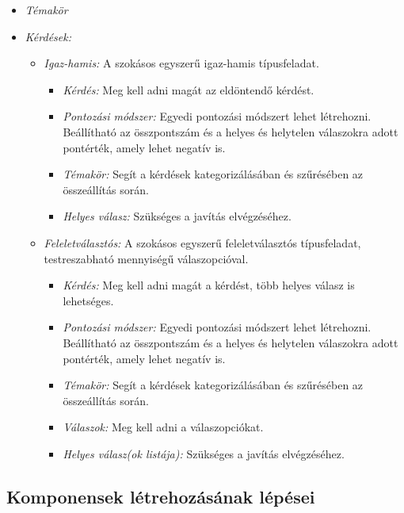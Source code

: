 \begin{itemize}
	\item \emph{Témakör}
	\item \emph{Kérdések:}
        \begin{itemize}
            \item \emph{Igaz-hamis:} A szokásos egyszerű igaz-hamis típusfeladat.
                \begin{itemize}
                    \item \emph{Kérdés:} Meg kell adni magát az eldöntendő kérdést.
                    \item \emph{Pontozási módszer:} Egyedi pontozási módszert lehet létrehozni. Beállítható az összpontszám és a helyes és helytelen válaszokra adott pontérték, amely lehet negatív is.
                    \item \emph{Témakör:} Segít a kérdések kategorizálásában és szűrésében az összeállítás során.
                    \item \emph{Helyes válasz:} Szükséges a javítás elvégzéséhez.
                \end{itemize}
            \item \emph{Feleletválasztós:} A szokásos egyszerű feleletválasztós típusfeladat, testreszabható mennyiségű válaszopcióval.
                \begin{itemize}
                    \item \emph{Kérdés:} Meg kell adni magát a kérdést, több helyes válasz is lehetséges.
                    \item \emph{Pontozási módszer:} Egyedi pontozási módszert lehet létrehozni. Beállítható az összpontszám és a helyes és helytelen válaszokra adott pontérték, amely lehet negatív is.
                    \item \emph{Témakör:} Segít a kérdések kategorizálásában és szűrésében az összeállítás során.
                    \item \emph{Válaszok:} Meg kell adni a válaszopciókat.
                    \item \emph{Helyes válasz(ok listája):} Szükséges a javítás elvégzéséhez.
                \end{itemize}
        \end{itemize}
\end{itemize}

\subsection{Komponensek létrehozásának lépései}


